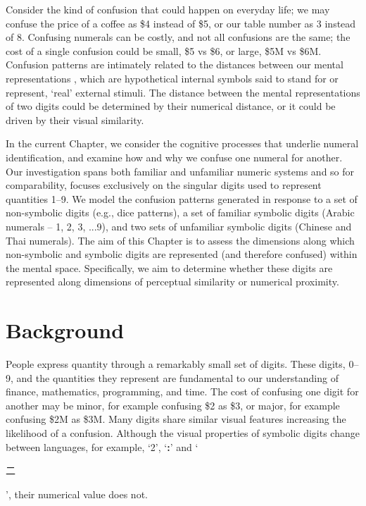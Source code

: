 Consider the kind of confusion that could happen on everyday life; we may confuse the price of a coffee as \$4 instead of \$5, or our table number as 3 instead of 8. Confusing numerals can be costly, and not all confusions are the same; the cost of a single confusion could be small, \$5 vs \$6, or large, \$5M vs \$6M. Confusion patterns are intimately related to the distances between our mental representations \cite{eidelsCassey2016mental}, which are hypothetical internal symbols said to stand for or represent, ‘real’ external stimuli. The distance between the mental representations of two digits could be determined by their numerical distance, or it could be driven by their visual similarity.

In the current Chapter, we consider the cognitive processes that underlie numeral identification, and examine how and why we confuse one numeral for another. Our investigation spans both familiar and unfamiliar numeric systems and so for comparability, focuses exclusively on the singular digits used to represent quantities 1--9. We model the confusion patterns generated in response to a set of non-symbolic digits (e.g., dice patterns), a set of familiar symbolic digits (Arabic numerals -- 1, 2, 3, ...9), and two sets of unfamiliar symbolic digits (Chinese and Thai numerals). The aim of this Chapter is to assess the dimensions along which non-symbolic and symbolic digits are represented (and therefore confused) within the mental space. Specifically, we aim to determine whether these digits are represented along dimensions of perceptual similarity or numerical proximity. 

\color{black}

\section{Background}
People express quantity through a remarkably small set of digits. These digits, 0--9, and the quantities they represent are fundamental to our understanding of finance, mathematics, programming, and time. The cost of confusing one digit for another may be minor, for example confusing \$2 as \$3, or major, for example confusing \$2M as \$3M. Many digits share similar visual features increasing the likelihood of a confusion. Although the visual properties of symbolic digits change between languages, for example, `2', `{\Large \textbf{:}}' and `\begin{CJK}{UTF8}{gbsn}二\end{CJK}', their numerical value does not. 

